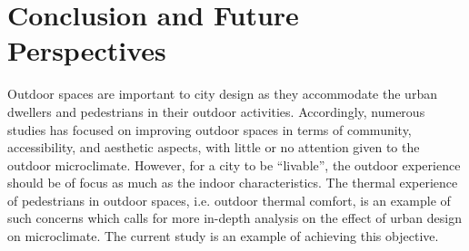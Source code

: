 \documentclass[smallextended]{svjour3}
\begin{document}
\section{Conclusion and Future Perspectives}
\label{sec:conc}
Outdoor spaces are important to city design as they accommodate the urban dwellers and pedestrians in their outdoor activities. Accordingly, numerous studies has focused on improving outdoor spaces in terms of community, accessibility, and aesthetic aspects, with little or no attention given to the outdoor microclimate.  However, for a city to be “livable”, the outdoor experience should be of focus as much as the indoor characteristics. The thermal experience of pedestrians in outdoor spaces, i.e. outdoor thermal comfort, is an example of such concerns which calls for more in-depth analysis on the effect of urban design on microclimate. The current study is an example of achieving this objective.
\end{document}

